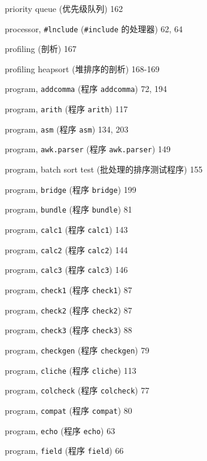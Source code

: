 \begin{multicols}{2}
\hangindent=2pc  priority queue (优先级队列) 162

\hangindent=2pc  processor, \verb'#lnclude' (\verb'#include'
的处理器) 62, 64

\hangindent=2pc  profiling (剖析) 167

\hangindent=2pc  profiling heapsort (堆排序的剖析) 168-169

\hangindent=2pc  program, \verb'addcomma' (程序 \verb'addcomma')
72, 194

\hangindent=2pc  program, \verb'arith' (程序 \verb'arith') 117

\hangindent=2pc  program, \verb'asm' (程序 \verb'asm') 134, 203

\hangindent=2pc  program, \verb'awk.parser' 
(程序 \verb'awk.parser') 149

\hangindent=2pc  program, batch sort test
(批处理的排序测试程序) 155

\hangindent=2pc  program, \verb'bridge' (程序 \verb'bridge') 199

\hangindent=2pc  program, \verb'bundle'  (程序 \verb'bundle') 81

\hangindent=2pc  program, \verb'calc1' (程序 \verb'calc1') 143

\hangindent=2pc  program, \verb'calc2' (程序 \verb'calc2') 144

\hangindent=2pc  program, \verb'calc3' (程序 \verb'calc3') 146

\hangindent=2pc  program, \verb'check1' (程序 \verb'check1') 87

\hangindent=2pc  program, \verb'check2' (程序 \verb'check2') 87

\hangindent=2pc  program, \verb'check3' (程序 \verb'check3') 88

\hangindent=2pc  program, \verb'checkgen' (程序 \verb'checkgen') 79

\hangindent=2pc  program, \verb'cliche' (程序 \verb'cliche') 113

\hangindent=2pc  program, \verb'colcheck' (程序 \verb'colcheck') 77

\hangindent=2pc  program, \verb'compat' (程序 \verb'compat') 80

\hangindent=2pc  program, \verb'echo' (程序 \verb'echo') 63

\hangindent=2pc  program, \verb'field' (程序 \verb'field') 66


\end{multicols}

